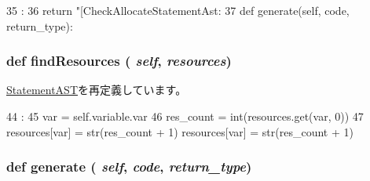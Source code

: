 \begin{DoxyCode}
35                       :
36         return "[CheckAllocateStatementAst: %
37 
    def generate(self, code, return_type):
\end{DoxyCode}
\hypertarget{classslicc_1_1ast_1_1CheckAllocateStatementAST_1_1CheckAllocateStatementAST_abd195c795639b490ba2de4c1246105f1}{
\subsubsection[{findResources}]{\setlength{\rightskip}{0pt plus 5cm}def findResources ( {\em self}, \/   {\em resources})}}
\label{classslicc_1_1ast_1_1CheckAllocateStatementAST_1_1CheckAllocateStatementAST_abd195c795639b490ba2de4c1246105f1}


\hyperlink{classslicc_1_1ast_1_1StatementAST_1_1StatementAST_abd195c795639b490ba2de4c1246105f1}{StatementAST}を再定義しています。


\begin{DoxyCode}
44                                       :
45         var = self.variable.var
46         res_count = int(resources.get(var, 0))
47         resources[var] = str(res_count + 1)
        resources[var] = str(res_count + 1)
\end{DoxyCode}
\hypertarget{classslicc_1_1ast_1_1CheckAllocateStatementAST_1_1CheckAllocateStatementAST_a4555d1cee0dccf3942ea35fe86de2e8e}{
\subsubsection[{generate}]{\setlength{\rightskip}{0pt plus 5cm}def generate ( {\em self}, \/   {\em code}, \/   {\em return\_\-type})}}
\label{classslicc_1_1ast_1_1CheckAllocateStatementAST_1_1CheckAllocateStatementAST_a4555d1cee0dccf3942ea35fe86de2e8e}



